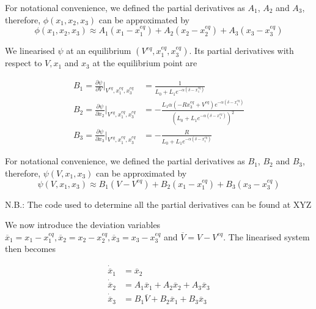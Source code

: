\documentclass[a4paper,10pt,reqno]{amsart}
\numberwithin{equation}{section}
\begin{document}
For notational convenience, we defined the partial derivatives as $A_1$, $A_2$ and $A_3$, therefore, $\phi(x_1, x_2, x_3)$ can be approximated by
\begin{equation}
     \phi(x_1, x_2, x_3) \approx A_1(x_1 - x_1^{eq}) + A_2(x_2 - x_2^{eq}) + A_3(x_3 - x_3^{eq})
\end{equation}

We linearised $\psi$ at an equilibrium $(V^{eq}, x_1^{eq}, x_3^{eq})$. Its partial derivatives with respect to $V, x_1$ and $x_3$ at the equilibrium point are

\begin{subequations}\label{eq:psiDeriv}
     \begin{align}
        B_1 = \frac{\partial\psi}{\partial V}\Bigg|_{V^{eq}, x_1^{eq}, x_3^{eq}} &= \frac{1}{L_{0} + L_{1} e^{- \alpha \left(\delta - x_{1}^{eq}\right)}} \\
        B_2 = \frac{\partial\psi}{\partial x_2}\Bigg|_{V^{eq}, x_1^{eq}, x_3^{eq}} &= - \frac{L_{1} \alpha \left(- R x_{3}^{eq} + V^{eq}\right) e^{- \alpha \left(\delta - x_{1}^{eq}\right)}}{\left(L_{0} + L_{1} e^{- \alpha \left(\delta - x_{1}^{eq}\right)}\right)^{2}} \\
        B_3 = \frac{\partial\psi}{\partial x_3}\Bigg|_{V^{eq}, x_1^{eq}, x_3^{eq}} &= - \frac{R}{L_{0} + L_{1} e^{- \alpha \left(\delta - x_{1}^{eq}\right)}}
     \end{align}
\end{subequations}

For notational convenience, we defined the partial derivatives as $B_1$, $B_2$ and $B_3$, therefore, $\psi(V, x_1, x_3)$ can be approximated by
\begin{equation}
     \psi(V, x_1, x_3) \approx B_1(V - V^{eq}) + B_2(x_1 - x_1^{eq}) + B_3(x_3 - x_3^{eq})
\end{equation}

N.B.: The code used to determine all the partial derivatives can be found at XYZ

We now introduce the deviation variables $\overline{x}_1 = x_1-x_1^{eq}, \overline{x}_2 = x_2-x_2^{eq}, \overline{x}_3 = x_3-x_3^{eq}$ and $\overline{V} = V-V^{eq}$. The linearised system then becomes

\begin{subequations}\label{eq:linear_system}
     \begin{align}
          \dot{\overline{x}}_1 &= \overline{x}_2 \\
          \dot{\overline{x}}_2 &= A_1\overline{x}_1  + A_2\overline{x}_2 + A_3\overline{x}_3\\
          \dot{\overline{x}}_3 &= B_1\overline{V} + B_2\overline{x}_1 + B_3\overline{x}_3
     \end{align}
\end{subequations}
\end{document}

